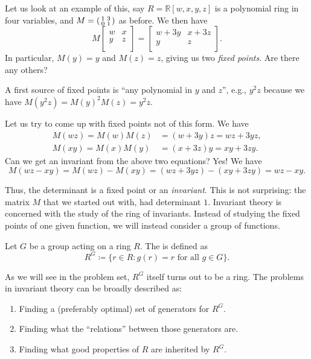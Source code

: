 \documentclass[12pt]{article}
\begin{document}
	Let us look at an example of this, say 
	$R = \mathbb{R}[w, x, y, z]$ is a polynomial ring in four variables, and 
	$M = \left(\begin{smallmatrix} 1 & 3 \\ 0 & 1 \end{smallmatrix}\right)$ as before. 
	We then have
	\begin{equation*} 
		M
		\begin{bmatrix}
			w & x \\
			y & z \\
		\end{bmatrix}
		=
		\begin{bmatrix}
			w + 3y & x + 3z \\
			y & z \\
		\end{bmatrix}.
	\end{equation*}
	In particular, $M(y) = y$ and $M(z) = z$, giving us two \emph{fixed points}. 
	Are there any others? 

	A first source of fixed points is ``any polynomial in $y$ and $z$'', e.g., 
	$y^{2} z$ because we have 
	$M(y^{2} z) = M(y)^{2} M(z) = y^{2} z$. 

	Let us try to come up with fixed points not of this form. 
	We have
	\begin{align*} 
		M(w z) = M(w) M(z) &= (w + 3y) z = w z + 3 y z, \\
		M(x y) = M(x) M(y) &= (x + 3z) y = x y + 3 z y.
	\end{align*}
	Can we get an invariant from the above two equations? 
	Yes! We have
	\begin{equation*} 
		M(w z - x y) = M(w z) - M(x y) 
		= (w z + 3 y z) - (x y + 3 z y )
		= w z - x y.
	\end{equation*}

	Thus, the determinant is a fixed point or an \emph{invariant}. This is not surprising: the matrix $M$ that we started out with, had determinant $1$. 
	Invariant theory is concerned with the study of the ring of invariants. 
	Instead of studying the fixed points of one given function, we will instead consider a group of functions.

	\begin{defn}
		Let $G$ be a group acting on a ring $R$. 
		The  is defined as
		\begin{equation*} 
			R^{G} \coloneqq \{r \in R : g(r) = r \text{ for all } g \in G\}.
		\end{equation*}
	\end{defn}

	As we will see in the problem set, $R^{G}$ itself turns out to be a ring. 
	The problems in invariant theory can be broadly described as:
	\begin{enumerate}[label=(\roman*)]
		\item Finding a (preferably optimal) set of generators for $R^{G}$.
		\item Finding what the ``relations'' between those generators are.
		\item Finding what good properties of $R$ are inherited by $R^{G}$.
	\end{enumerate}
\end{document}
